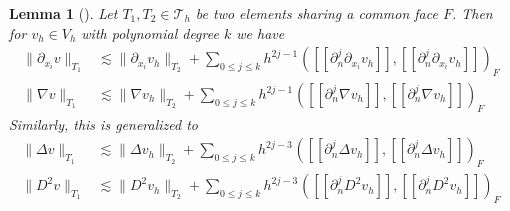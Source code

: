 \documentclass[11pt]{article}
\newtheorem{lemma}[theorem]{Lemma}
\theoremstyle{remark}
\newcommand{\jump}[1]{\left[\!\left[ #1 \right]\!\right]}
\renewcommand{\le}{\leqslant}
\numberwithin{equation}{section}
\begin{document}
\begin{lemma}[]
    \label{lemma:bi_local_facet_estimate_2}
    Let $T_{1},T_{2 } \in  \mathcal{T} _{h}$ be two elements sharing a common face $F$. Then for $v_{h} \in V_{h}$ with polynomial degree $k$ we have
    \begin{subequations}
    \begin{align}
        \label{eq:local_ghost:0}
        \| \partial _{x_{i}} v \|_{ T_{1} }^{  }  &\lesssim \| \partial_{ x_{i} } v_{h} \|_{ T_{2} }^{  } + \sum_{0\le j\le k}  {h^{2j -1}}^{} ( \jump{ \partial _{n}^{j} \partial _{x_{i}} v_{h} }, \jump{ \partial ^{j}_{n} \partial _{x_{i}} v_{h} }
        )_{F} \\
        \label{eq:local_ghost:1}
        \| \nabla  v \|_{ T_{1} }^{  }  & \lesssim \| \nabla  v_{h} \|_{ T_{2} }^{  } + \sum_{0\le j\le k}  {h^{2j -1}}^{} ( \jump{ \partial _{n}^{j} \nabla v_{h} }, \jump{ \partial ^{j}_{n} \nabla  v_{h} }    )_{F}
    \end{align}
    \end{subequations}
    Similarly, this is generalized to
    \begin{subequations}
        \begin{align}
        \label{eq:local_ghost:2}
        \| \Delta   v \|_{ T_{1} }^{  }  & \lesssim \| \Delta  v_{h} \|_{ T_{2} }^{  } + \sum_{0\le j\le k}  {h^{2j -3}}^{} ( \jump{ \partial _{n}^{j}\Delta  v_{h} }, \jump{ \partial ^{j}_{n} \Delta   v_{h} }    )_{F} \\
        \label{eq:local_ghost:3}
        \| D^2  v \|_{ T_{1} }^{  }  & \lesssim \| D^2 v_{h} \|_{ T_{2} }^{  } + \sum_{0\le j\le k}  {h^{2j -3}}^{} ( \jump{ \partial _{n}^{j} D^2 v_{h} }, \jump{ \partial ^{j}_{n} D^2  v_{h} }    )_{F}
        \end{align}
    \end{subequations}

\end{lemma}
\end{document}
